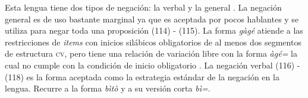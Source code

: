 Esta lengua tiene dos tipos de negación: la verbal y la general \textcolor{MidnightBlue}{\citep{zapoteco}}. La negación general es de uso bastante marginal ya que es aceptada por pocos hablantes y se utiliza para negar toda una proposición (114) - (115). La forma {\setmainfont{Charis SIL} \textit{gàgé}} atiende a las restricciones de \textit{items} con inicios silábicos obligatorios de al menos dos segmentos de estructura \textsc{cv}, pero tiene una relación de variación libre con la forma {\setmainfont{Charis SIL} \textit{àgé=}} la cual no cumple con la condición de inicio obligatorio \textcolor{MidnightBlue}{\citep[pág. 51]{zapoteco}}. La negación verbal (116) - (118) es la forma aceptada como la estrategia estándar de la negación en la lengua. Recurre a la forma {\setmainfont{Charis SIL} \textit{bìtò}} y a su versión corta {\setmainfont{Charis SIL} \textit{bì=}}.

                                                
        